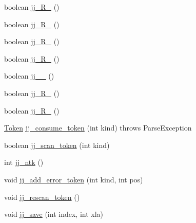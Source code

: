 \begin{DoxyCompactItemize}
\item 
boolean \hyperlink{classorg_1_1coode_1_1owlapi_1_1functionalparser_1_1_o_w_l_functional_syntax_parser_a3937e71d55c5251bd5a201fa6d26ba23}{jj\-\_\-R\-\_} ()
\item 
boolean \hyperlink{classorg_1_1coode_1_1owlapi_1_1functionalparser_1_1_o_w_l_functional_syntax_parser_a4f0f830bfe1ce810630276ac484a9fb5}{jj\-\_\-R\-\_} ()
\item 
boolean \hyperlink{classorg_1_1coode_1_1owlapi_1_1functionalparser_1_1_o_w_l_functional_syntax_parser_a995d8fdf842f0fb26755d4a1d9e28a57}{jj\-\_\-R\-\_} ()
\item 
boolean \hyperlink{classorg_1_1coode_1_1owlapi_1_1functionalparser_1_1_o_w_l_functional_syntax_parser_afc5bfc8174b2ce9a7b78f2e203c05efd}{jj\-\_\-R\-\_} ()
\item 
boolean \hyperlink{classorg_1_1coode_1_1owlapi_1_1functionalparser_1_1_o_w_l_functional_syntax_parser_a7a7134db7f940ef5a3247c751164b045}{jj\-\_\-\_} ()
\item 
boolean \hyperlink{classorg_1_1coode_1_1owlapi_1_1functionalparser_1_1_o_w_l_functional_syntax_parser_a4b96f8aa29de8a02c1f5ddb1651dd206}{jj\-\_\-R\-\_} ()
\item 
boolean \hyperlink{classorg_1_1coode_1_1owlapi_1_1functionalparser_1_1_o_w_l_functional_syntax_parser_a0a37277ff2b513a86add06dfa6c9f790}{jj\-\_\-R\-\_} ()
\item 
\hyperlink{classorg_1_1coode_1_1owlapi_1_1functionalparser_1_1_token}{Token} \hyperlink{classorg_1_1coode_1_1owlapi_1_1functionalparser_1_1_o_w_l_functional_syntax_parser_a6228cabf1639d039d2882cffb316b684}{jj\-\_\-consume\-\_\-token} (int kind)  throws Parse\-Exception 
\item 
boolean \hyperlink{classorg_1_1coode_1_1owlapi_1_1functionalparser_1_1_o_w_l_functional_syntax_parser_a3361f4d94e52a16d0ccef9edd258cb4f}{jj\-\_\-scan\-\_\-token} (int kind)
\item 
int \hyperlink{classorg_1_1coode_1_1owlapi_1_1functionalparser_1_1_o_w_l_functional_syntax_parser_a34eb79acb1201aea86640805e263544c}{jj\-\_\-ntk} ()
\item 
void \hyperlink{classorg_1_1coode_1_1owlapi_1_1functionalparser_1_1_o_w_l_functional_syntax_parser_a3a1f20df053f4b39cd7f2293c9f541b4}{jj\-\_\-add\-\_\-error\-\_\-token} (int kind, int pos)
\item 
void \hyperlink{classorg_1_1coode_1_1owlapi_1_1functionalparser_1_1_o_w_l_functional_syntax_parser_adf5f86c126c1d84f1fc1d48f8b1e1d9f}{jj\-\_\-rescan\-\_\-token} ()
\item 
void \hyperlink{classorg_1_1coode_1_1owlapi_1_1functionalparser_1_1_o_w_l_functional_syntax_parser_a2127e1c40dd5e2a9a20ea19640218651}{jj\-\_\-save} (int index, int xla)
\end{DoxyCompactItemize}

